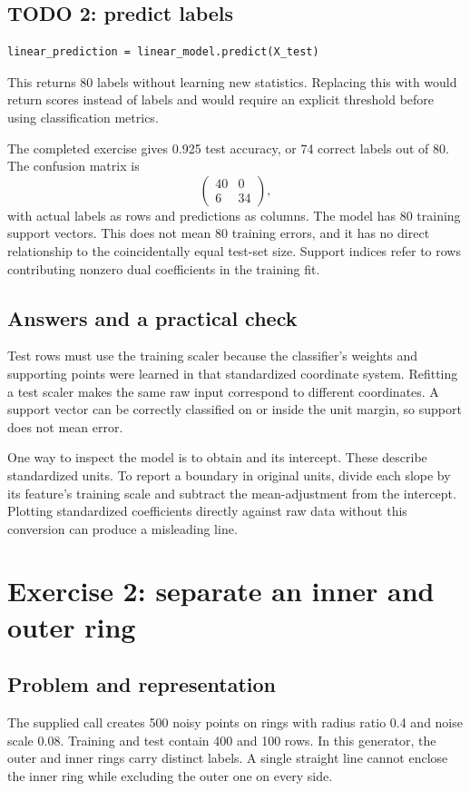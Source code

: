 \subsection{TODO 2: predict labels}
\begin{lstlisting}
linear_prediction = linear_model.predict(X_test)
\end{lstlisting}
This returns 80 labels without learning new statistics. Replacing this with 
would return scores instead of labels and would require an explicit threshold before using classification metrics.

The completed exercise gives 0.925 test accuracy, or 74 correct labels out of 80. The confusion matrix is
\[\begin{pmatrix}40&0\\6&34\end{pmatrix},\]
with actual labels as rows and predictions as columns. The model has 80 training support vectors.
This does not mean 80 training errors, and it has no direct relationship to the coincidentally equal test-set size.
Support indices refer to rows contributing nonzero dual coefficients in the training fit.

\subsection{Answers and a practical check}
Test rows must use the training scaler because the classifier's weights and supporting points were learned
in that standardized coordinate system. Refitting a test scaler makes the same raw input correspond to different
coordinates. A support vector can be correctly classified on or inside the unit margin, so support does not mean error.

One way to inspect the model is to obtain  and its intercept.
These describe standardized units. To report a boundary in original units, divide each slope by its feature's
training scale and subtract the mean-adjustment from the intercept. Plotting standardized coefficients directly
against raw data without this conversion can produce a misleading line.

\section{Exercise 2: separate an inner and outer ring}
\subsection{Problem and representation}
The supplied  call creates 500 noisy points on rings with radius ratio 0.4 and noise scale 0.08.
Training and test contain 400 and 100 rows. In this generator, the outer and inner rings carry distinct labels.
A single straight line cannot enclose the inner ring while excluding the outer one on every side.

